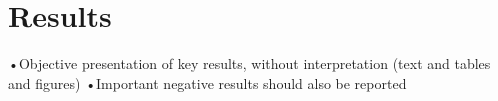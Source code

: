 \section{Results}

•Objective presentation of key results, without interpretation (text and tables
and figures)
•Important negative results should also be reported
